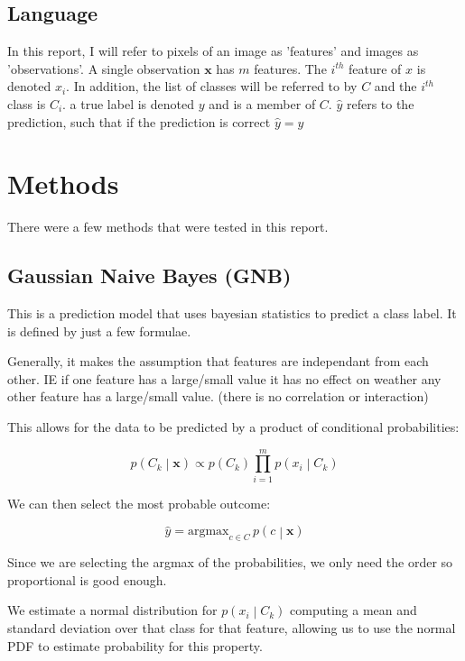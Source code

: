 \documentclass[11pt]{article}
\begin{document}
\subsection{Language}
\label{sec:org6d05148}
In this report, I will refer to pixels of an image as 'features' and images as 'observations'. A single observation \(\mathbf{x}\) has \(m\) features. The \(i^{th}\) feature of \(x\) is denoted \(x_i\). In addition, the list of classes will be referred to by \(C\) and the \(i^{th}\) class is \(C_i\). a true label is denoted \(y\) and is a member of \(C\). \(\widehat y\) refers to the prediction, such that if the prediction is correct \(\widehat y = y\)

\section{Methods}
\label{sec:orgc47525f}
There were a few methods that were tested in this report.
\subsection{Gaussian Naive Bayes (GNB)}
\label{sec:orgad6d765}
This is a prediction model that uses bayesian statistics to predict a class label. It is defined by just a few formulae.

Generally, it makes the assumption that features are independant from each other. IE if one feature has a large/small value it has no effect on weather any other feature has a large/small value. (there is no correlation or interaction)

This allows for the data to be predicted by a product of conditional probabilities:

\begin{equation}
p\left(C_k\middle|\mathbf{x}\right) \propto p\left(C_k\right) \prod\limits_{i=1}^mp\left(x_i \middle|C_k\right)
\end{equation}


We can then select the most probable outcome:

\begin{equation}
\widehat {y} = \mbox{argmax}_{c \in C} \,p\left(c\middle|\mathbf{x}\right)
\end{equation}

Since we are selecting the argmax of the probabilities, we only need the order so proportional is good enough.

We estimate a normal distribution for \(p\left(x_i\middle|C_k\right)\) computing a mean and standard deviation over that class for that feature, allowing us to use the normal PDF to estimate probability for this property.
\end{document}

